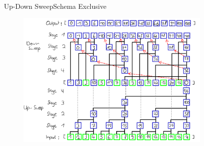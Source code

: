 \begin{frame}{Up-Down Sweep}{Schema Exclusive}
 \begin{figure}
  \centering
  \includegraphics[width=0.85\textwidth]{wiki/ExclusiveUpDown}
 \end{figure}
\end{frame}

